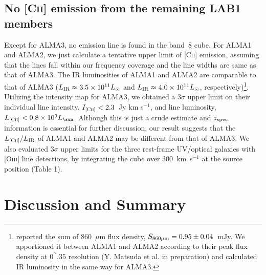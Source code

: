 \documentclass[apj]{emulateapj}
\begin{document}
\subsection{No \textsc{[Cii]} emission from the remaining LAB1 members}

Except for ALMA3, no emission line is found in the band~8 cube.
For ALMA1 and ALMA2, we just calculate a tentative upper limit of \textsc{[Cii]} emission, assuming that 
the lines fall within our frequency coverage and the line widths are same as that of ALMA3.
The IR luminosities of ALMA1 and ALMA2 are comparable to that of ALMA3 ($L_{\rm IR}\approx3.5\times10^{11}L_\odot$ and $L_{\rm IR}\approx4.0\times10^{11}L_\odot$, respectively)\footnote{
\citet{2016ApJ...832...37G} reported the sum of 860~$\mu$m flux density, $S_{\rm 860 \mu m}=0.95\pm0.04$~mJy.
We apportioned it between ALMA1 and ALMA2 according to their peak flux density at $0^{\prime\prime}.35$ resolution (Y. Matsuda et al. in preparation) and calculated IR luminosity in the same way for ALMA3.}.
Utilizing the intensity map for ALMA3, we obtained a 3$\sigma$ upper limit on their individual line intensity, $I_\textsc{[Cii]}<2.3$~Jy km s$^{-1}$, and line luminosity, $ L_\textsc{[Cii]}<0.8 \times10^{9} L_\sun$.
Although this is just a crude estimate and $z_{\rm spec}$ information is essential for further discussion, 
our result suggests that the $L_\textsc{[Cii]}/L_{\rm IR}$ of ALMA1 and ALMA2 may be different from that of ALMA3.
We also evaluated 3$\sigma$ upper limits for the three rest-frame UV/optical galaxies with \textsc{[Oiii]} line detections, by integrating the cube over 300~km~s$^{-1}$ at the source position (Table 1).


\section{Discussion and Summary}
\end{document}
